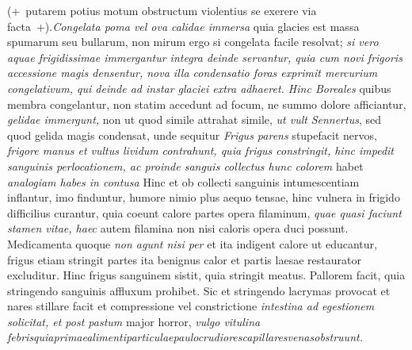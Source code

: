 (+~putarem potius motum obstructum violentius se exerere via facta~+).\textit{Congelata poma\protect{} vel ova\protect{} calidae immersa } quia glacies\protect{} est massa spumarum seu bullarum, non mirum ergo si congelata facile resolvat; \textit{si vero aquae frigidissimae immergantur integra deinde servantur, quia cum novi frigoris accessione magis densentur, nova illa condensatio foras exprimit mercurium congelativum\protect{}, qui deinde ad instar glaciei extra adhaeret. Hinc Boreales\protect{}} quibus membra  congelantur, non statim accedunt ad focum, ne summo dolore afficiantur,  \textit{gelidae immergunt,} non ut quod simile attrahat simile, \textit{ut vult }\textit{Sennertus}\protect{}, sed quod gelida magis condensat, unde sequitur  \textit{Frigus parens}  stupefacit nervos, \textit{frigore manus et vultus lividum}  \textit{contrahunt,
quia frigus constringit, hinc impedit sanguinis perlocationem\protect{}, ac proinde sanguis collectus\protect{} hunc colorem} habet \textit{analogiam habes in contusa } Hinc et ob collecti sanguinis intumescentiam inflantur, imo finduntur, humore nimio plus aequo tensae, hinc vulnera\protect{} in frigido difficilius curantur, quia coeunt calore partes opera filaminum, \textit{quae quasi faciunt stamen vitae, haec} autem filamina non nisi caloris opera duci possunt. Medicamenta\protect{} quoque \textit{non agunt nisi per } et ita indigent calore ut educantur, frigus etiam stringit partes ita benignus calor et partis laesae restaurator excluditur. Hinc frigus sanguinem sistit, quia stringit meatus. Pallorem facit, quia stringendo sanguinis affluxum prohibet. Sic et stringendo lacrymas\protect{} provocat et nares\protect{} stillare facit et compressione vel constrictione \textit{intestina ad egestionem solicitat, et post pastum } major horror, \textit{vulgo vitulina febris\hfill quia\hfill primae\hfill alimenti\hfill particulae\hfill paulo\hfill crudiores\hfill capillares\hfill venas\protect{}\hfill obstruunt.}
